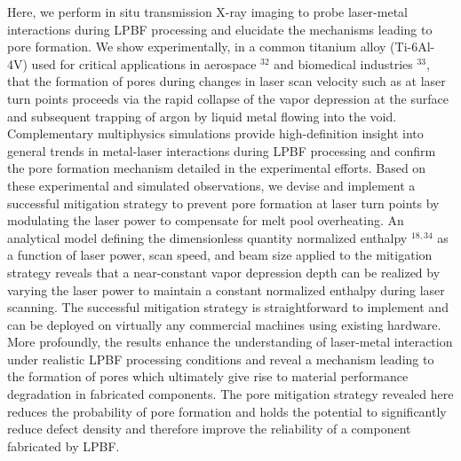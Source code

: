 \documentclass[10pt]{article}
\begin{document}
Here, we perform in situ transmission X-ray imaging to probe laser-metal interactions during LPBF processing and elucidate the mechanisms leading to pore formation. We show experimentally, in a common titanium alloy (Ti-6Al-4V) used for critical applications in aerospace ${ }^{32}$ and biomedical industries ${ }^{33}$, that the formation of pores during changes in laser scan velocity such as at laser turn points proceeds via the rapid collapse of the vapor depression at the surface and subsequent trapping of argon by liquid metal flowing into the void. Complementary multiphysics simulations provide high-definition insight into general trends in metal-laser interactions during LPBF processing and confirm the pore formation mechanism detailed in the experimental efforts. Based on these experimental and simulated observations, we devise and implement a successful mitigation strategy to prevent pore formation at laser turn points by modulating the laser power to compensate for melt pool overheating. An analytical model defining the dimensionless quantity normalized enthalpy ${ }^{18,34}$ as a function of laser power, scan speed, and beam size applied to the mitigation strategy reveals that a near-constant vapor depression depth can be realized by varying the laser power to maintain a constant normalized enthalpy during laser scanning. The successful mitigation strategy is straightforward to implement and can be deployed on virtually any commercial machines using existing hardware. More profoundly, the results enhance the understanding of laser-metal interaction under realistic LPBF processing conditions and reveal a mechanism leading to the formation of pores which ultimately give rise to material performance degradation in fabricated components. The pore mitigation strategy revealed here reduces the probability of pore formation and holds the potential to significantly reduce defect density and therefore improve the reliability of a component fabricated by LPBF.
\end{document}
